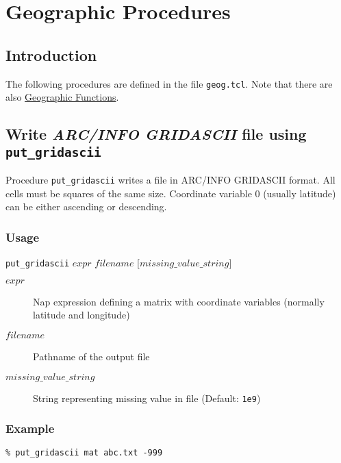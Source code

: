 
\section{Geographic Procedures}
    \label{geog-proc}

\subsection{Introduction}
    \label{geog-proc-Introduction}

The following procedures are defined in the file 
  \texttt{geog.tcl}. Note that there are also 
  \href{geog.html}{Geographic Functions}.

\subsection{Write \emph{ARC/INFO GRIDASCII} file using \texttt{put\_gridascii}}
    \label{geog-proc-put-gridascii}

Procedure 
  \texttt{put\_gridascii} writes a file in ARC/INFO GRIDASCII
  format. All cells must be squares of the same size. Coordinate
  variable 0 (usually latitude) can be either ascending or descending.

  \subsubsection{Usage}

  \texttt{put\_gridascii} $\mathit{expr}$ $\mathit{filename}$ [$\mathit{missing\_value\_string}$]
  \begin{description}
    \item[$\mathit{expr}$]
    Nap expression defining a matrix with coordinate variables (normally latitude and longitude)
    \item[$\mathit{filename}$]
    Pathname of the output file
    \item[$\mathit{missing\_value\_string}$]
    String representing missing value in file (Default: \texttt{1e9})
  \end{description}

  \subsubsection{Example}

  \texttt{\% put\_gridascii mat abc.txt -999}

